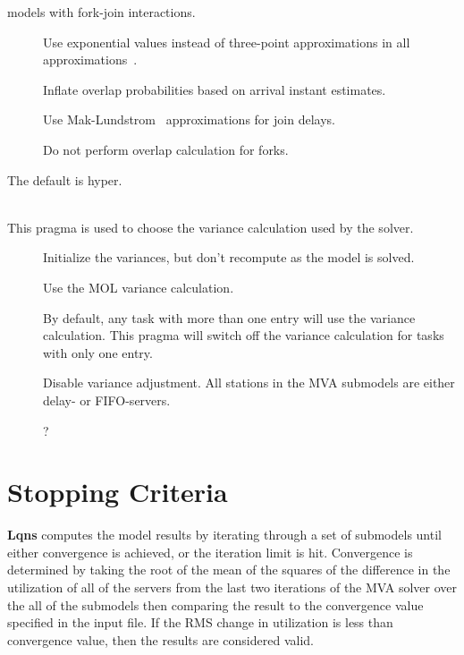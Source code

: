 \begin{description}
models with fork-join interactions.
\begin{description}
\item[]
Use exponential values instead of three-point approximations in all approximations~\cite{perf:jiang-96}.
\item[]
Inflate overlap probabilities based on arrival instant estimates.
\item[]
Use Mak-Lundstrom~\cite{perf:mak-90} approximations for join delays.
\item[]
Do not perform overlap calculation for forks.
\end{description}
The default is hyper.
\item[\optarg{variance}{=\emph{arg}}]~\\
This pragma is used to choose the variance calculation used by the solver.
\begin{description}
\item[]
Initialize the variances, but don't recompute as the model is solved.
\item[]
Use the MOL variance calculation.
\item[]
By default, any task with more than one entry will use the variance calculation.  This pragma will switch off the variance calculation for tasks with only one entry.
\item[]
Disable variance adjustment.  All stations in the MVA submodels are either delay- or FIFO-servers.
\item[]
?
\end{description}

\end{description}
\section{Stopping Criteria}
\label{sec:lqns-stopping-criteria}
\textbf{Lqns} computes the model results by iterating through a set of
submodels until either convergence is achieved, or the iteration limit
is hit. Convergence is determined by taking the root of the mean of
the squares of the difference in the utilization of all of the servers
from the last two iterations of the MVA solver over the all of the
submodels then comparing the result to the convergence value specified
in the input file. If the RMS change in utilization is less than
convergence value, then the results are considered valid.


